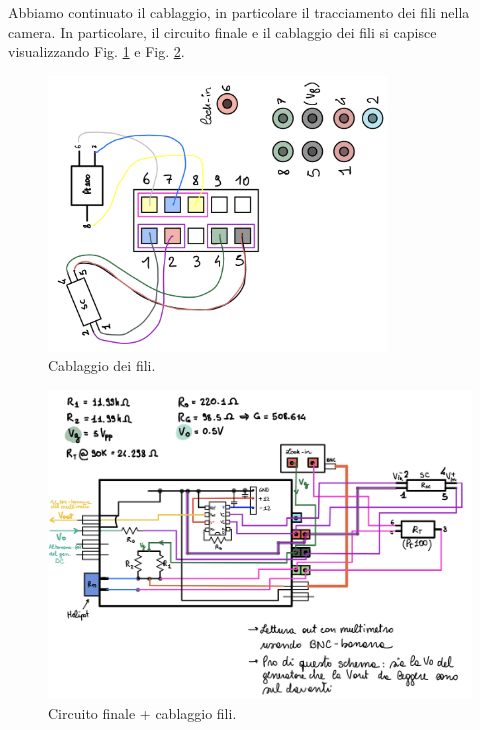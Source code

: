 \documentclass[../main/main.tex]{subfiles}
\begin{document}

Abbiamo continuato il cablaggio, in particolare il tracciamento dei fili nella camera. In particolare, il circuito finale e il cablaggio dei fili si capisce visualizzando Fig. \ref{fig:10_4} e Fig. \ref{fig:10_5}.

\begin{figure}[h!]
\centering
\includegraphics[width=0.8\textwidth]{../lessons/image/10/4.png}
\caption{\label{fig:10_4} Cablaggio dei fili.}
\end{figure}

\begin{figure}[h!]
\centering
\includegraphics[width=1\textwidth]{../lessons/image/10/5.png}
\caption{\label{fig:10_5} Circuito finale + cablaggio fili.}
\end{figure}
\end{document}
